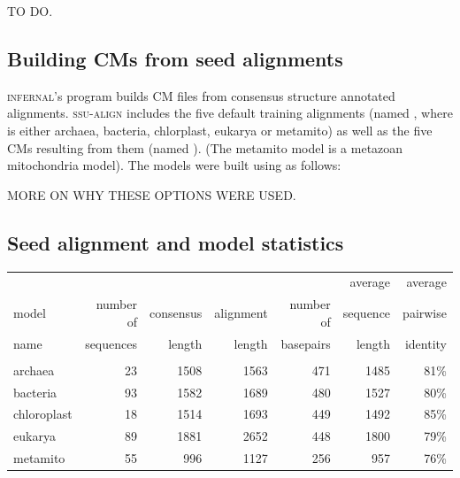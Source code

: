 TO DO.

\subsection{Building CMs from seed alignments}

\textsc{infernal}'s  program builds CM files from
consensus structure annotated alignments. \textsc{ssu-align} includes
the five default training alignments (named , where
 is either archaea, bacteria, chlorplast, eukarya or
metamito) as well as the five CMs resulting from them (named
). (The metamito model is a metazoan mitochondria
model). The models were built using  as
follows: 

MORE ON WHY THESE OPTIONS WERE USED.

\subsection{Seed alignment and model statistics} 

\begin{center}
\begin{tabular}{lrrrrrr}
        &           &           &           &           & average   & average  \\
model   & number of & consensus & alignment & number of & sequence  & pairwise \\
name    & sequences & length    & length    & basepairs & length    & identity \\ \hline
        &           &           &           &                       &          \\
archaea & 23        & 1508      & 1563      & 471       & 1485      & 81\%     \\
bacteria& 93        & 1582      & 1689      & 480       & 1527      & 80\%     \\
chloroplast& 18     & 1514      & 1693      & 449       & 1492      & 85\%     \\
eukarya  & 89       & 1881      & 2652      & 448       & 1800      & 79\%     \\ 
metamito & 55       &  996      & 1127      & 256       & 957       & 76\%     \\
\end{tabular}
\end{center}

